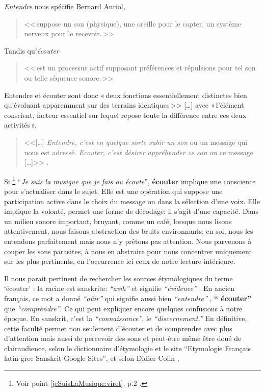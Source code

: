 \textit{Entendre} nous spécifie Bernard Auriol, \autocite[p. 2, ch . 1]{auriol:cle}
\begin{quote}
	<<\,suppose un son (physique), une oreille
	pour le capter, un système nerveux pour le recevoir.\,>>
\end{quote} 
Tandis qu'\textit{écouter} 
\begin{quote}
	<<\,est un
	processus actif supposant préférences et répulsions pour tel son ou
	telle séquence sonore.\,>>
\end{quote}


Entendre et écouter sont donc  «\,deux
fonctions essentiellement distinctes bien qu'évoluant apparemment sur
des terrains identiques\,>>
[\dots] avec «\,l'élément conscient, facteur essentiel sur lequel repose toute la
différence entre ces deux activités\,».\autocite[]{tomatis_oreille_1991}
\begin{quote}
	
	<<[\ldots] \emph{Entendre, c'est en quelque sorte subir
		un son} ou un message qui nous est adressé. \emph{Ecouter, c'est désirer appréhender ce son} ou ce message [\ldots]>>
	\autocite{tomatis:education}.	
\end{quote}



Si %
\footnote{Voir point \ref{jeSuisLaMusique:viret}, p.2 \pageref{jeSuisLaMusique:viret}.}
\enquote{\emph{Je suis la musique que je fais ou écoute}}\autocite{viret:b}, \textbf{écouter} implique 
une conscience pour s'actualiser dans le sujet. Elle est une opération 
qui suppose une participation active dans le choix du message
ou dans la sélection d'une voix. Elle  implique la volonté,
permet une forme de décodage: il s'agit d'une capacité.
Dans un milieu sonore important,
 bruyant, comme un café, lorsque nous lisons attentivement, nous faisons abstraction
des bruits environnants; en soi, nous les entendons parfaitement mais nous n'y
prêtons pas attention. Nous parvenons à couper les sons parasites, à nous en abstraire pour
nous concentrer uniquement sur les plus  pertinents, en l'occurrence
ici ceux de notre lecture intérieure.


Il nous parait pertinent de rechercher les sources étymologiques du
terme `écouter' :
 la racine est sanskrite:  \emph{ ``avih'' }  et signifie  \emph{``évidence'' }. En ancien
 français, ce mot a donné \textit{``oüir''} qui signifie aussi bien \textit{``entendre''} ,
\textbf{`` écouter'' } que \textit{``comprendre''}. Ce qui peut
expliquer encore quelques confusions à notre époque. En sanskrit, c'est la
\textit{``connaissance''}, le \textit{``discernement.''}
En définitive, cette faculté
permet non seulement d'écouter et de comprendre avec plus d'attention
mais aussi de percevoir des sons et peut-être même être doué de
clairaudience, selon le dictionnaire d'étymologie et le site
``Etymologie Français latin grec Sanskrit-Google Sites'', et selon Didier
Colin \autocite{Didier Colin,2015 ``Interprétez vos rêves''},


